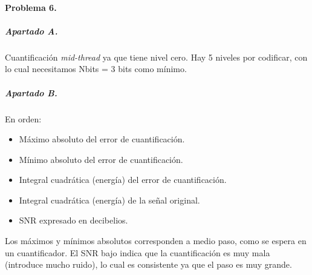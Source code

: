 \finishpage


\startpage
\paragraph{Problema 6.}

\subparagraph{Apartado A.}

Cuantificación \emph{mid-thread} ya que tiene nivel cero. Hay 5 niveles por
codificar, con lo cual necesitamos \textsf{Nbits} = 3 bits como mínimo.

\subparagraph{Apartado B.}

En orden:

\begin{itemize}
\item Máximo absoluto del error de cuantificación.
\item Mínimo absoluto del error de cuantificación.
\item Integral cuadrática (energía) del error de cuantificación.
\item Integral cuadrática (energía) de la señal original.
\item SNR expresado en decibelios.
\end{itemize}

Los máximos y mínimos absolutos corresponden a medio paso, como se espera
en un cuantificador. El SNR bajo indica que la cuantificación es muy mala
(introduce mucho ruido), lo cual es consistente ya que el paso es muy grande.

\finishpage

